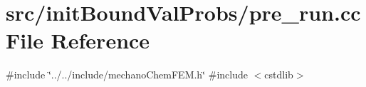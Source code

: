 \section{src/init\+Bound\+Val\+Probs/pre\+\_\+run.cc File Reference}
\label{pre__run_8cc}
{\ttfamily \#include \char`\"{}../../include/mechano\+Chem\+F\+E\+M.\+h\char`\"{}}\newline
{\ttfamily \#include $<$cstdlib$>$}\newline
